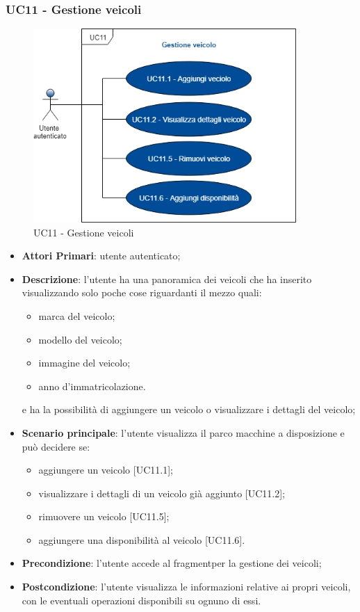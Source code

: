  \subsubsection{UC11 - Gestione veicoli}
  \begin{figure}[H]
 	\includegraphics[width=10cm]{res/images/UC10Gestioneveicolo.png}
 	\centering
 	\caption{UC11 - Gestione veicoli}
 \end{figure}
 \begin{itemize}
 	\item \textbf{Attori Primari}: utente autenticato;
 	\item \textbf{Descrizione}: l'utente ha una panoramica dei veicoli che ha inserito visualizzando solo poche cose riguardanti il mezzo quali:
 	\begin{itemize}
 		\item marca del veicolo;
 		\item modello del veicolo;
 		\item immagine del veicolo;
 		\item anno d'immatricolazione.
 	\end{itemize} 
 	e ha la possibilità di aggiungere un veicolo o visualizzare i dettagli del veicolo;
 	\item \textbf{Scenario principale}: l'utente visualizza il parco macchine a disposizione e può decidere se:
 	\begin{itemize}
 		\item aggiungere un veicolo [UC11.1];
 		\item visualizzare i dettagli di un veicolo già aggiunto [UC11.2];
 		\item rimuovere un veicolo [UC11.5];
 		\item aggiungere una disponibilità al veicolo [UC11.6].
 	\end{itemize}
 	\item \textbf{Precondizione}: l'utente accede al fragment\glosp per la gestione dei veicoli;
 	\item \textbf{Postcondizione}: l'utente visualizza le informazioni relative ai propri veicoli, con le eventuali operazioni disponibili su ognuno di essi.
 \end{itemize}
